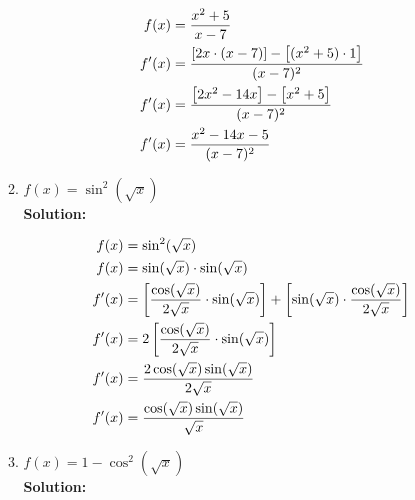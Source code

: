 \documentclass[a4paper]{article}
\begin{document}
\begin{enumerate}
\begin{enumerate}
	
\begin{align}
	f(x) &= \frac{x^2 + 5}{x - 7}\notag\\
	f'(x) &= \frac{\left[2x \cdot (x-7) \right] - \left[ (x^2+5) \cdot 1 \right]}{(x-7)^2}\notag\\
	f'(x) &= \frac{\left[ 2x^2 - 14x \right] - \left[ x^2 + 5 \right]}{(x-7)^2}\notag\\
	f'(x) &= \frac{x^2 - 14x - 5}{(x-7)^2}\notag
\end{align}		
	
	\item $f(x) = \sin^2 (\sqrt{x})$\\
	\textbf{Solution:}\\

	


\begin{align}
	f(x) &= \sin^2 (\sqrt{x})\notag\\
	f(x) &= \sin(\sqrt{x}) \cdot \sin(\sqrt{x})\notag\\
	f'(x) &= \left[ \frac{\cos(\sqrt{x})}{2\sqrt{x} } \cdot \sin(\sqrt{x})\right] + \left[ \sin(\sqrt{x}) \cdot \frac{\cos(\sqrt{x})}{2\sqrt{x}}\right]\notag\\
	f'(x) &= 2\left[ \frac{\cos(\sqrt{x})}{2\sqrt{x} } \cdot \sin(\sqrt{x})\right]\notag\\
	f'(x) &= \frac{2 \cos(\sqrt{x}) \sin(\sqrt{x}) }{2\sqrt{x} }\notag\\
	f'(x) &= \frac{\cos(\sqrt{x}) \sin(\sqrt{x}) }{\sqrt{x} }\notag
\end{align}			
	
	
	\item $f(x) = 1 - \cos^2 (\sqrt{x})$\\
	\textbf{Solution:}\\
	

\end{enumerate}
\end{enumerate}
\end{document}
